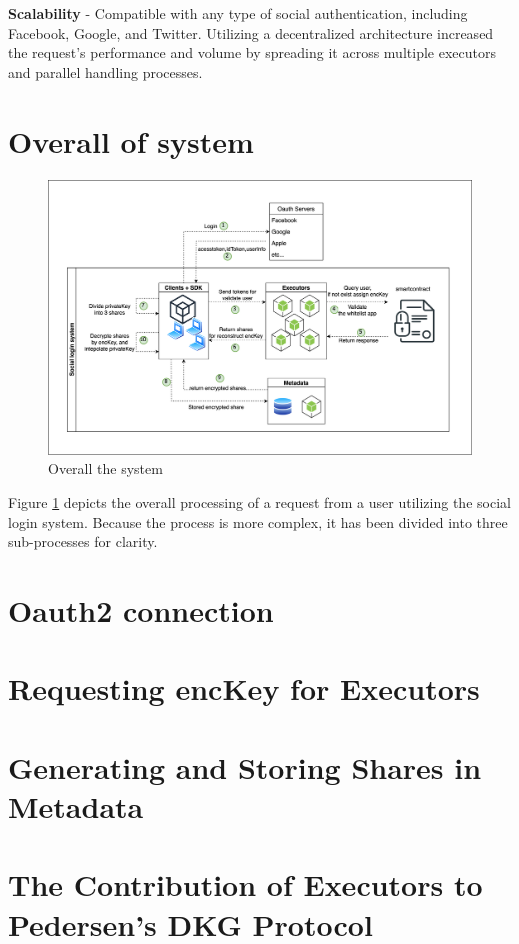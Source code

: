 \documentclass[../Main.tex]{subfiles}
\begin{document}
\indent\textbf{Scalability} - Compatible with any type of social authentication, including Facebook, Google, and Twitter. Utilizing a decentralized architecture increased the request's performance and volume by spreading it across multiple executors and parallel handling processes.
\newpage
\section{Overall of system}
\begin{figure}[H]
 \centering
 \includegraphics[scale=0.1]{Figure/OverallSocialLoginSystem.png}
    \caption{Overall the system}
    \label{fig:OverallSystem}
\end{figure}
Figure \ref{fig:OverallSystem} depicts the overall processing of a request from a user utilizing the social login system. Because the process is more complex, it has been divided into three sub-processes for clarity.

\section{Oauth2 connection}
\section{Requesting encKey for Executors}
\section{Generating and Storing Shares in Metadata}
\section{The Contribution of Executors to Pedersen's DKG Protocol}
\end{document}
